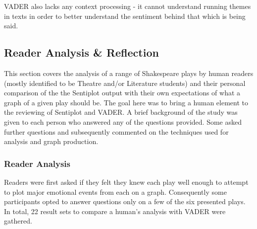 \documentclass{article}
\begin{document}
        VADER also lacks any context processing - it cannot understand running themes in texts in order to better understand the sentiment behind that which is being said.
    \subsection{Reader Analysis \& Reflection}
    \label{subsec:reader}
        This section covers the analysis of a range of Shakespeare plays by human readers (mostly identified to be Theatre and/or Literature students) and their personal comparison of the the Sentiplot output with their own expectations of what a graph of a given play should be. The goal here was to bring a human element to the reviewing of Sentiplot and VADER. A brief background of the study was given to each person who answered any of the questions provided. Some asked further questions and subsequently commented on the techniques used for analysis and graph production.
        \subsubsection{Reader Analysis}
            Readers were first asked if they felt they knew each play well enough to attempt to plot major emotional events from each on a graph. Consequently some participants opted to answer questions only on a few of the six presented plays. In total, 22 result sets to compare a human's analysis with VADER were gathered.
\end{document}
